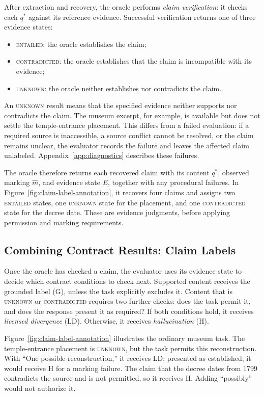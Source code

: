 \documentclass{clv2025}
\newcommand{\LD}{\textsc{LD}}
\newcommand{\Hall}{\textsc{H}}
\newcommand{\Grd}{\textsc{G}}
\begin{document}
After extraction and recovery, the oracle performs \emph{claim verification}:
it checks each $q^*$ against its reference evidence. Successful verification
returns one of three evidence states:
\begin{itemize}
\item \textsc{entailed}: the oracle establishes the claim;
\item \textsc{contradicted}: the oracle establishes that the claim is incompatible with its evidence;
\item \textsc{unknown}: the oracle neither establishes nor contradicts the claim.
\end{itemize}
An \textsc{unknown} result means that the specified evidence neither supports
nor contradicts the claim. The museum excerpt, for example, is available but
does not settle the temple-entrance placement. This differs from a failed
evaluation: if a required source is inaccessible, a source conflict cannot
be resolved, or the claim remains unclear, the evaluator records the failure
and leaves the affected claim unlabeled. Appendix~\ref{app:diagnostics}
describes these failures.

The oracle therefore returns each recovered claim with its content $q^*$,
observed marking $\widehat{m}$, and evidence state $E$, together with any
procedural failures. In Figure~\ref{fig:claim-label-annotation}, it recovers
four claims and assigns two \textsc{entailed} states, one \textsc{unknown}
state for the placement, and one \textsc{contradicted} state for the decree
date. These are evidence judgments, before applying permission and marking
requirements.

\subsection{Combining Contract Results: Claim Labels}\label{subsec:rule}

Once the oracle has checked a claim, the evaluator uses its evidence state
to decide which contract conditions to check next. Supported content receives
the grounded label (\Grd), unless the task explicitly excludes it. Content
that is \textsc{unknown} or \textsc{contradicted} requires two further checks:
does the task permit it, and does the response present it as required?
If both conditions hold, it receives \emph{licensed divergence} (\LD).
Otherwise, it receives \emph{hallucination} (\Hall).

Figure~\ref{fig:claim-label-annotation} illustrates the ordinary museum task.
The temple-entrance placement is \textsc{unknown}, but the task permits this
reconstruction. With ``One possible reconstruction,'' it receives \LD{};
presented as established, it would receive \Hall{} for a marking failure.
The claim that the decree dates from 1799 contradicts the source and is not
permitted, so it receives \Hall{}. Adding ``possibly'' would not authorize it.
\end{document}
